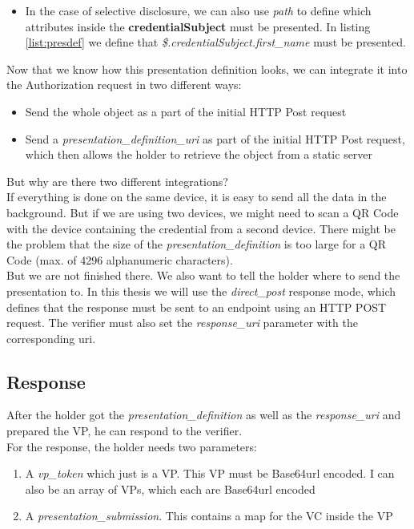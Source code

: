 \documentclass[
	a4paper               %
	,bibliography=totoc   %
	,listof=totoc         %
	,monolingual
]{bfhthesis}              %
\begin{document}
\begin{enumerate}
\begin{itemize}
\begin{itemize}
\begin{itemize}
				\item In the case of selective disclosure, we can also use \textit{path} to define which attributes inside the \textbf{credentialSubject} must be presented. In listing \ref{list:presdef} we define that \textit{\$.credentialSubject.first\_name} must be presented.
			\end{itemize}
		\end{itemize}
	\end{itemize}
\end{enumerate}

Now that we know how this presentation definition looks, we can integrate it into the Authorization request in two different ways:
\begin{itemize}
	\item Send the whole object as a part of the initial HTTP Post request
	\item Send a \textit{presentation\_definition\_uri} as part of the initial HTTP Post request, which then allows the holder to retrieve the object from a static server
\end{itemize}

But why are there two different integrations?\\
If everything is done on the same device, it is easy to send all the data in the background. But if we are using two devices, we might need to scan a QR Code with the device containing the credential from a second device. There might be the problem that the size of the \textit{presentation\_definition} is too large for a QR Code (max. of 4296 alphanumeric characters).\\

But we are not finished there. We also want to tell the holder where to send the presentation to.
In this thesis we will use the \textit{direct\_post} response mode, which defines that the response must be sent to an endpoint using an HTTP POST request. The verifier must also set the \textit{response\_uri} parameter with the corresponding uri.

\subsection{Response}
After the holder got the \textit{presentation\_definition} as well as the \textit{response\_uri} and prepared the VP, he can respond to the verifier.\\

For the response, the holder needs two parameters:
\begin{enumerate}
	\item A \textit{vp\_token} which just is a VP. This VP must be Base64url encoded. I can also be an array of VPs, which each are Base64url encoded
	\item A \textit{presentation\_submission}. This contains a map for the VC inside the VP
\end{enumerate}
\end{document}
